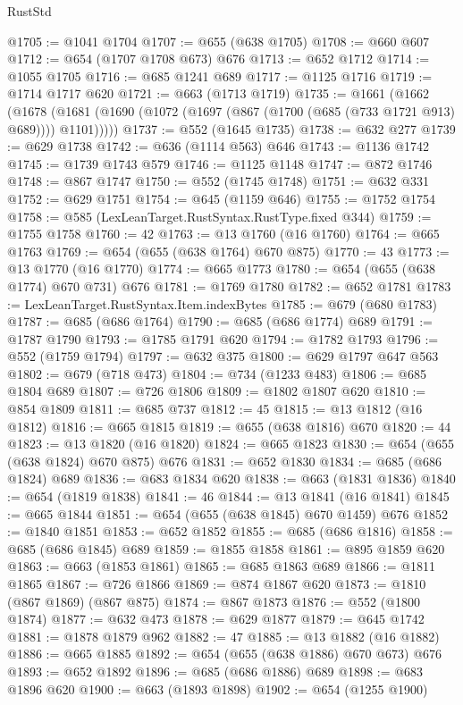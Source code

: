 \begin{lexlean}{RustStd}
\begin{coremodule}
@1705 := @1041 @1704
@1707 := @655 (@638 @1705)
@1708 := @660 @607
@1712 := @654 (@1707 @1708 @673) @676
@1713 := @652 @1712
@1714 := @1055 @1705
@1716 := @685 @1241 @689
@1717 := @1125 @1716
@1719 := @1714 @1717 @620
@1721 := @663 (@1713 @1719)
@1735 := @1661
    (@1662
      (@1678 (@1681 (@1690 (@1072 (@1697 (@867 (@1700 (@685 (@733 @1721 @913) @689)))) @1101)))))
@1737 := @552 (@1645 @1735)
@1738 := @632 @277
@1739 := @629 @1738
@1742 := @636 (@1114 @563) @646
@1743 := @1136 @1742
@1745 := @1739 @1743 @579
@1746 := @1125 @1148
@1747 := @872 @1746
@1748 := @867 @1747
@1750 := @552 (@1745 @1748)
@1751 := @632 @331
@1752 := @629 @1751
@1754 := @645 (@1159 @646)
@1755 := @1752 @1754
@1758 := @585 (LexLeanTarget.RustSyntax.RustType.fixed @344)
@1759 := @1755 @1758
@1760 := 42
@1763 := @13 @1760 (@16 @1760)
@1764 := @665 @1763
@1769 := @654 (@655 (@638 @1764) @670 @875)
@1770 := 43
@1773 := @13 @1770 (@16 @1770)
@1774 := @665 @1773
@1780 := @654 (@655 (@638 @1774) @670 @731) @676
@1781 := @1769 @1780
@1782 := @652 @1781
@1783 := LexLeanTarget.RustSyntax.Item.indexBytes
@1785 := @679 (@680 @1783)
@1787 := @685 (@686 @1764)
@1790 := @685 (@686 @1774) @689
@1791 := @1787 @1790
@1793 := @1785 @1791 @620
@1794 := @1782 @1793
@1796 := @552 (@1759 @1794)
@1797 := @632 @375
@1800 := @629 @1797 @647 @563
@1802 := @679 (@718 @473)
@1804 := @734 (@1233 @483)
@1806 := @685 @1804 @689
@1807 := @726 @1806
@1809 := @1802 @1807 @620
@1810 := @854 @1809
@1811 := @685 @737
@1812 := 45
@1815 := @13 @1812 (@16 @1812)
@1816 := @665 @1815
@1819 := @655 (@638 @1816) @670
@1820 := 44
@1823 := @13 @1820 (@16 @1820)
@1824 := @665 @1823
@1830 := @654 (@655 (@638 @1824) @670 @875) @676
@1831 := @652 @1830
@1834 := @685 (@686 @1824) @689
@1836 := @683 @1834 @620
@1838 := @663 (@1831 @1836)
@1840 := @654 (@1819 @1838)
@1841 := 46
@1844 := @13 @1841 (@16 @1841)
@1845 := @665 @1844
@1851 := @654 (@655 (@638 @1845) @670 @1459) @676
@1852 := @1840 @1851
@1853 := @652 @1852
@1855 := @685 (@686 @1816)
@1858 := @685 (@686 @1845) @689
@1859 := @1855 @1858
@1861 := @895 @1859 @620
@1863 := @663 (@1853 @1861)
@1865 := @685 @1863 @689
@1866 := @1811 @1865
@1867 := @726 @1866
@1869 := @874 @1867 @620
@1873 := @1810 (@867 @1869) (@867 @875)
@1874 := @867 @1873
@1876 := @552 (@1800 @1874)
@1877 := @632 @473
@1878 := @629 @1877
@1879 := @645 @1742
@1881 := @1878 @1879 @962
@1882 := 47
@1885 := @13 @1882 (@16 @1882)
@1886 := @665 @1885
@1892 := @654 (@655 (@638 @1886) @670 @673) @676
@1893 := @652 @1892
@1896 := @685 (@686 @1886) @689
@1898 := @683 @1896 @620
@1900 := @663 (@1893 @1898)
@1902 := @654 (@1255 @1900)

\end{coremodule}
\end{lexlean}
